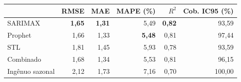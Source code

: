\begin{tabular}{lrrrrr}
\toprule
 & RMSE & MAE & MAPE (\%) & $R^2$ & Cob. IC95 (\%) \\
\midrule
SARIMAX & \textbf{1,65} & \textbf{1,31} & 5,49 & \textbf{0,82} & 93,59 \\
Prophet & 1,66 & 1,33 & \textbf{5,48} & 0,81 & 97,44 \\
STL & 1,81 & 1,45 & 5,93 & 0,78 & 93,59 \\
Combinado & 1,68 & 1,34 & 5,53 & 0,81 & 96,15 \\
Ingênuo sazonal & 2,12 & 1,73 & 7,16 & 0,70 & 100,00 \\
\bottomrule
\end{tabular}
